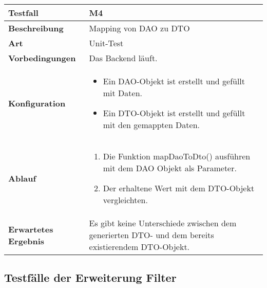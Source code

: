 \begin{longtable}{p{}|p{}}
	\hline
	\textbf{Testfall}               & \textbf{M4} \\
	\hline
	\textbf{Beschreibung}   		& Mapping von DAO zu DTO \\
	\hline
	\textbf{Art}    				& Unit-Test \\
	\hline
	\textbf{Vorbedingungen}    		& Das Backend läuft. \\
	\hline
	\textbf{Konfiguration}   	 	& 
	\begin{itemize}
		\item Ein DAO-Objekt ist erstellt und gefüllt mit Daten.
		\item Ein DTO-Objekt ist erstellt und gefüllt mit den gemappten Daten.
	\end{itemize} \\
	\hline
	\textbf{Ablauf}    				& 
	\begin{enumerate}
		\item Die Funktion mapDaoToDto() ausführen mit dem DAO Objekt als Parameter.
		\item Der erhaltene Wert mit dem DTO-Objekt vergleichten.
	\end{enumerate} \\
	\hline
	\textbf{Erwartetes Ergebnis}    & Es gibt keine Unterschiede zwischen dem generierten DTO- und dem bereits existierendem DTO-Objekt. \\
	\hline
\end{longtable}\label{tab:testfall-M4}

\subsection{Testfälle der Erweiterung Filter}

